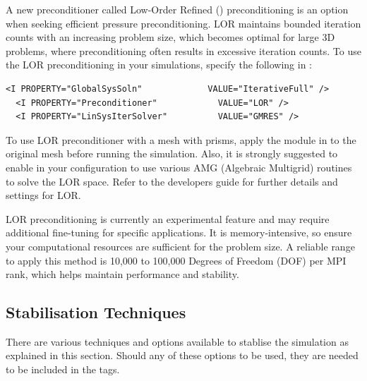 \begin{itemize}
A new preconditioner called Low-Order Refined () preconditioning is an option when seeking efficient pressure preconditioning.  LOR  maintains bounded iteration counts with an increasing problem size, which becomes optimal for large 3D problems, where  preconditioning often results in excessive iteration counts.
To use the LOR preconditioning in your simulations, specify the following in :
\begin{lstlisting}[style=XMLStyle]
  <I PROPERTY="GlobalSysSoln"             VALUE="IterativeFull" />
  <I PROPERTY="Preconditioner"            VALUE="LOR" />
  <I PROPERTY="LinSysIterSolver"          VALUE="GMRES" />
\end{lstlisting}
To use LOR preconditioner with a mesh with prisms, apply the  module in  to the original mesh before running the simulation.
Also, it is strongly suggested to enable  in your configuration to use various AMG (Algebraic Multigrid) routines to solve the LOR space. Refer to the developers guide for further details and settings for LOR.

LOR preconditioning is currently an experimental feature and may require additional fine-tuning for specific applications. It is memory-intensive, so ensure your computational resources are sufficient for the problem size. A reliable range to apply this method is 10,000 to 100,000 Degrees of Freedom (DOF) per MPI rank, which helps maintain performance and stability. 
\end{itemize}


\subsection{Stabilisation Techniques}
There are various techniques and options available to stablise the simulation as
explained in this section. Should any of these options to be used, they are 
needed to be included in the  tags.
